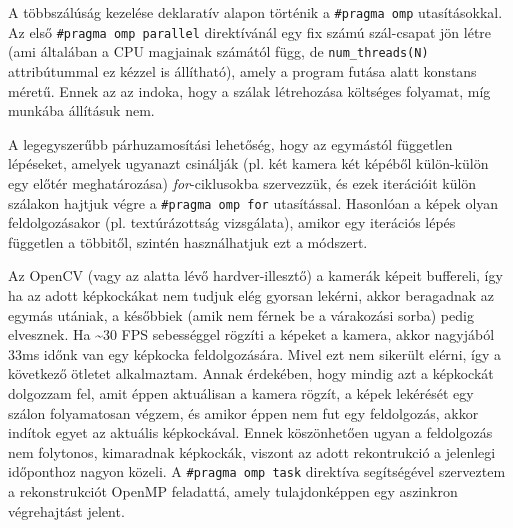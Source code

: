 A többszálúság kezelése deklaratív alapon történik a \texttt{\#pragma omp} utasításokkal. Az első \texttt{\#pragma omp parallel} direktívánál egy fix számú szál-csapat jön létre (ami általában a CPU magjainak számától függ, de \texttt{num\_threads(N)} attribútummal ez kézzel is állítható), amely a program futása alatt konstans méretű. Ennek az az indoka, hogy a szálak létrehozása költséges folyamat, míg munkába állításuk nem.

A legegyszerűbb párhuzamosítási lehetőség, hogy az egymástól független lépéseket, amelyek ugyanazt csinálják (pl. két kamera két képéből külön-külön egy előtér meghatározása) \textit{for}-ciklusokba szervezzük, és ezek iterációit külön szálakon hajtjuk végre a \texttt{\#pragma omp for} utasítással. Hasonlóan a képek olyan feldolgozásakor (pl. textúrázottság vizsgálata), amikor egy iterációs lépés független a többitől, szintén használhatjuk ezt a módszert.

Az OpenCV (vagy az alatta lévő hardver-illesztő) a kamerák képeit buffereli, így ha az adott képkockákat nem tudjuk elég gyorsan lekérni, akkor beragadnak az egymás utániak, a későbbiek (amik nem férnek be a várakozási sorba) pedig elvesznek. Ha \textasciitilde{}30 FPS sebességgel rögzíti a képeket a kamera, akkor nagyjából 33ms időnk van egy képkocka feldolgozására. Mivel ezt nem sikerült elérni, így a következő ötletet alkalmaztam. Annak érdekében, hogy mindig azt a képkockát dolgozzam fel, amit éppen aktuálisan a kamera rögzít, a képek lekérését egy szálon folyamatosan végzem, és amikor éppen nem fut egy feldolgozás, akkor indítok egyet az aktuális képkockával. Ennek köszönhetően ugyan a feldolgozás nem folytonos, kimaradnak képkockák, viszont az adott rekontrukció a jelenlegi időponthoz nagyon közeli. A \texttt{\#pragma omp task} direktíva segítségével szerveztem a rekonstrukciót OpenMP feladattá, amely tulajdonképpen egy aszinkron végrehajtást jelent.


